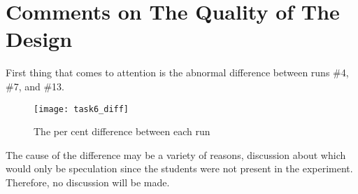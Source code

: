\clearpage
\section{Comments on The Quality of The Design}

First thing that comes to attention is the abnormal difference between runs \#4, \#7, and \#13.
\begin{figure}[H]
    \begin{center}
        \texttt{[image: task6\_diff]}
    \end{center}
    \caption{The per cent difference between each run}
\end{figure}

The cause of the difference may be a variety of reasons, discussion about which would only be speculation since the students were not present in the experiment. Therefore, no discussion will be made.